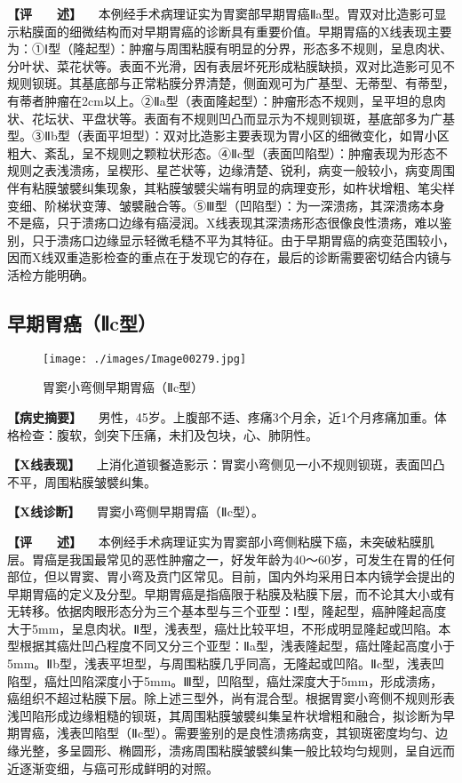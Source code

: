 \textbf{【评　　述】}
　本例经手术病理证实为胃窦部早期胃癌Ⅱa型。胃双对比造影可显示粘膜面的细微结构而对早期胃癌的诊断具有重要价值。早期胃癌的X线表现主要为：①Ⅰ型（隆起型）：肿瘤与周围粘膜有明显的分界，形态多不规则，呈息肉状、分叶状、菜花状等。表面不光滑，因有表层坏死形成粘膜缺损，双对比造影可见不规则钡斑。其基底部与正常粘膜分界清楚，侧面观可为广基型、无蒂型、有蒂型，有蒂者肿瘤在2cm以上。②Ⅱa型（表面隆起型）：肿瘤形态不规则，呈平坦的息肉状、花坛状、平盘状等。表面有不规则凹凸而显示为不规则钡斑，基底部多为广基型。③Ⅱb型（表面平坦型）：双对比造影主要表现为胃小区的细微变化，如胃小区粗大、紊乱，呈不规则之颗粒状形态。④Ⅱc型（表面凹陷型）：肿瘤表现为形态不规则之表浅溃疡，呈楔形、星芒状等，边缘清楚、锐利，病变一般较小，病变周围伴有粘膜皱襞纠集现象，其粘膜皱襞尖端有明显的病理变形，如杵状增粗、笔尖样变细、阶梯状变薄、皱襞融合等。⑤Ⅲ型（凹陷型）：为一深溃疡，其深溃疡本身不是癌，只于溃疡口边缘有癌浸润。X线表现其深溃疡形态很像良性溃疡，难以鉴别，只于溃疡口边缘显示轻微毛糙不平为其特征。由于早期胃癌的病变范围较小，因而X线双重造影检查的重点在于发现它的存在，最后的诊断需要密切结合内镜与活检方能明确。

\subsection{早期胃癌（Ⅱc型）}

\begin{figure}[!htbp]
 \centering
 \texttt{[image: ./images/Image00279.jpg]}
 \captionsetup{justification=centering}
 \caption{胃窦小弯侧早期胃癌（Ⅱc型）}
 \label{fig5-3-17}
  \end{figure} 

\textbf{【病史摘要】}
　男性，45岁。上腹部不适、疼痛3个月余，近1个月疼痛加重。体格检查：腹软，剑突下压痛，未扪及包块，心、肺阴性。

\textbf{【X线表现】}
　上消化道钡餐造影示：胃窦小弯侧见一小不规则钡斑，表面凹凸不平，周围粘膜皱襞纠集。

\textbf{【X线诊断】} 　胃窦小弯侧早期胃癌（Ⅱc型）。

\textbf{【评　　述】}
　本例经手术病理证实为胃窦部小弯侧粘膜下癌，未突破粘膜肌层。胃癌是我国最常见的恶性肿瘤之一，好发年龄为40～60岁，可发生在胃的任何部位，但以胃窦、胃小弯及贲门区常见。目前，国内外均采用日本内镜学会提出的早期胃癌的定义及分型。早期胃癌是指癌限于粘膜及粘膜下层，而不论其大小或有无转移。依据肉眼形态分为三个基本型与三个亚型：Ⅰ型，隆起型，癌肿隆起高度大于5mm，呈息肉状。Ⅱ型，浅表型，癌灶比较平坦，不形成明显隆起或凹陷。本型根据其癌灶凹凸程度不同又分三个亚型：Ⅱa型，浅表隆起型，癌灶隆起高度小于5mm。Ⅱb型，浅表平坦型，与周围粘膜几乎同高，无隆起或凹陷。Ⅱc型，浅表凹陷型，癌灶凹陷深度小于5mm。Ⅲ型，凹陷型，癌灶深度大于5mm，形成溃疡，癌组织不超过粘膜下层。除上述三型外，尚有混合型。根据胃窦小弯侧不规则形表浅凹陷形成边缘粗糙的钡斑，其周围粘膜皱襞纠集呈杵状增粗和融合，拟诊断为早期胃癌，浅表凹陷型（Ⅱc型）。需要鉴别的是良性溃疡病变，其钡斑密度均匀、边缘光整，多呈圆形、椭圆形，溃疡周围粘膜皱襞纠集一般比较均匀规则，呈自远而近逐渐变细，与癌可形成鲜明的对照。

